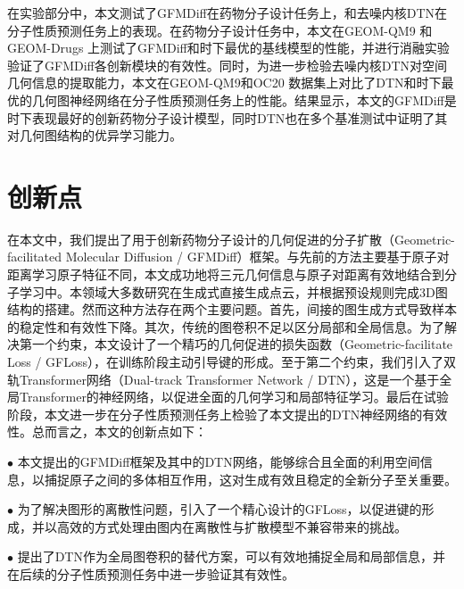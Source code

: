 在实验部分中，本文测试了GFMDiff在药物分子设计任务上，和去噪内核DTN在分子性质预测任务上的表现。在药物分子设计任务中，本文在GEOM-QM9 \cite{qm9_ramakrishnan_14}和GEOM-Drugs \cite{drugs_axelrod_22}上测试了GFMDiff和时下最优的基线模型的性能，并进行消融实验验证了GFMDiff各创新模块的有效性。同时，为进一步检验去噪内核DTN对空间几何信息的提取能力，本文在GEOM-QM9和OC20 \cite{oc20_chanussot_21}数据集上对比了DTN和时下最优的几何图神经网络在分子性质预测任务上的性能。结果显示，本文的GFMDiff是时下表现最好的创新药物分子设计模型，同时DTN也在多个基准测试中证明了其对几何图结构的优异学习能力。

\section{创新点}
在本文中，我们提出了用于创新药物分子设计的几何促进的分子扩散（Geometric-facilitated Molecular Diffusion / GFMDiff）框架。与先前的方法主要基于原子对距离学习原子特征不同，本文成功地将三元几何信息与原子对距离有效地结合到分子学习中。本领域大多数研究在生成式直接生成点云，并根据预设规则完成3D图结构的搭建。然而这种方法存在两个主要问题。首先，间接的图生成方式导致样本的稳定性和有效性下降。其次，传统的图卷积不足以区分局部和全局信息。为了解决第一个约束，本文设计了一个精巧的几何促进的损失函数（Geometric-facilitate Loss / GFLoss），在训练阶段主动引导键的形成。至于第二个约束，我们引入了双轨Transformer网络（Dual-track Transformer Network / DTN），这是一个基于全局Transformer的神经网络，以促进全面的几何学习和局部特征学习。最后在试验阶段，本文进一步在分子性质预测任务上检验了本文提出的DTN神经网络的有效性。总而言之，本文的创新点如下：

$\bullet$ 本文提出的GFMDiff框架及其中的DTN网络，能够综合且全面的利用空间信息，以捕捉原子之间的多体相互作用，这对生成有效且稳定的全新分子至关重要。

$\bullet$ 为了解决图形的离散性问题，引入了一个精心设计的GFLoss，以促进键的形成，并以高效的方式处理由图内在离散性与扩散模型不兼容带来的挑战。

$\bullet$ 提出了DTN作为全局图卷积的替代方案，可以有效地捕捉全局和局部信息，并在后续的分子性质预测任务中进一步验证其有效性。


